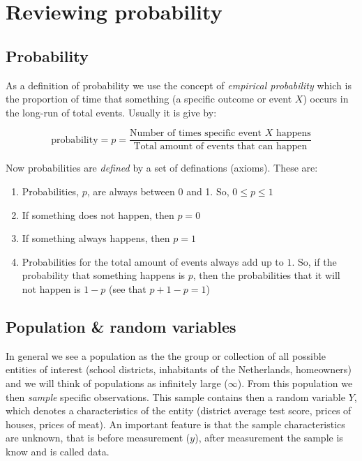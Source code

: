 \documentclass[
]{book}
\providecommand{\tightlist}{%
  \setlength{\itemsep}{0pt}\setlength{\parskip}{0pt}}
\begin{document}
\hypertarget{reviewing-probability}{%
\section{Reviewing probability}\label{reviewing-probability}}

\hypertarget{probability}{%
\subsection{Probability}\label{probability}}

As a definition of probability we use the concept of \emph{empirical probability} which is the proportion of time that something (a specific outcome or event \(X\)) occurs in the long-run of total events. Usually it is give by:

\begin{equation}
 \text{probability} = p = \frac{\text{Number of times specific event $X$ happens}}{\text{Total amount of events that can happen}}
\end{equation}

Now probabilities are \emph{defined} by a set of definations (axioms). These are:

\begin{enumerate}
\def\labelenumi{\arabic{enumi})}
\tightlist
\item
  Probabilities, \(p\), are always between 0 and 1. So, \(0 \leq p \leq 1\)
\item
  If something does not happen, then \(p = 0\)
\item
  If something always happens, then \(p = 1\)
\item
  Probabilities for the total amount of events always add up to \(1\). So, if the probability that something happens is \(p\), then the probabilities that it will not happen is \(1 -p\) (see that \(p + 1 - p = 1\))
\end{enumerate}

\hypertarget{population-random-variables}{%
\subsection{Population \& random variables}\label{population-random-variables}}

In general we see a population as the the group or collection of all possible entities of interest (school districts, inhabitants of the Netherlands, homeowners) and we will think of populations as infinitely large (\(\infty\)). From this population we then \emph{sample} specific observations. This sample contains then a random variable \(Y\), which denotes a characteristics of the entity (district average test score, prices of houses, prices of meat). An important feature is that the sample characteristics are unknown, that is before measurement (\(y\)), after measurement the sample is know and is called data.
\end{document}

